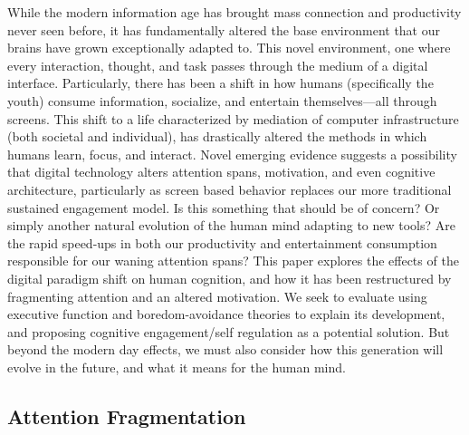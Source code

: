 \documentclass[12pt,letterpaper]{article}
\begin{document}
While the modern information age has brought mass connection and productivity never seen before, it has fundamentally altered the base environment that our brains have grown exceptionally adapted to. This novel environment, one where every interaction, thought, and task passes through the medium of a digital interface. Particularly, there has been a shift in how humans (specifically the youth) consume information, socialize, and entertain themselves---all through screens. This shift to a life characterized by mediation of computer infrastructure (both societal and individual), has drastically altered the methods in which humans learn, focus, and interact. Novel emerging evidence suggests a possibility that digital technology alters attention spans, motivation, and even cognitive architecture, particularly as screen based behavior replaces our more traditional sustained engagement model. Is this something that should be of concern? Or simply another natural evolution of the human mind adapting to new tools? Are the rapid speed-ups in both our productivity and entertainment consumption responsible for our waning attention spans? This paper explores the effects of the digital paradigm shift on human cognition, and how it has been restructured by fragmenting attention and an altered motivation. We seek to evaluate using executive function and boredom-avoidance theories to explain its development, and proposing cognitive engagement/self regulation as a potential solution. But beyond the modern day effects, we must also consider how this generation will evolve in the future, and what it means for the human mind.

\subsection*{Attention Fragmentation}
\end{document}

